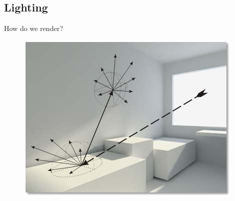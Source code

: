 \documentclass[10pt]{beamer}
\begin{document}

\subsection{Lighting}
\begin{frame}{How do we render?}
  \begin{figure}
    \includegraphics[width=\textwidth]{indirectlighting}
  \end{figure}
\end{frame}
\end{document}

